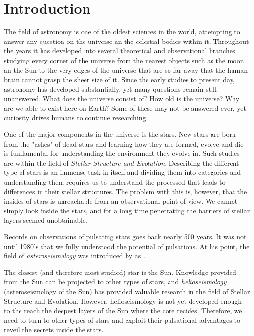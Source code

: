 \chapter{Introduction}

The field of astronomy is one of the oldest sciences in the world, attempting to answer any question on the universe an the celestial bodies within it. Throughout the years it has developed into several theoretical and observational branches studying every corner of the universe from the nearest objects such as the moon an the Sun to the very edges of the universe that are so far away that the human brain cannot grasp the sheer size of it. Since the early studies to present day, astronomy has developed substantially, yet many questions remain still unanswered. What does the universe consist of? How old is the universe? Why are we able to exist here on Earth? Some of these may not be answered ever, yet curiosity drives humans to continue researching. 

One of the major components in the universe is the stars. New stars are born from the "ashes" of dead stars and learning how they are formed, evolve and die is fundamental for understanding the environment they evolve in. Such studies are within the field of \textit{Stellar Structure and Evolution}. Describing the different type of stars is an immense task in itself and dividing them into categories and understanding them requires us to understand the processed that leads to differences in their stellar structures. The problem with this is, however, that the insides of stars is unreachable from an observational point of view. We cannot simply look inside the stars, and for a long time penetrating the barriers of stellar layers seemed unobtainable.

Records on observations of pulsating stars goes back nearly 500 years. It was not until 1980's that we fully understood the potential of pulsations. At his point, the field of \textit{asteroseismology} was introduced by \citet{christensen1984} as    
.

The closest (and therefore most studied) star is the Sun. Knowledge provided from the Sun can be projected to other types of stars, and \textit{helioseismology} (asteroseismology of the Sun) has provided valuable research in the field of Stellar Structure and Evolution. However, helioseismology is not yet developed enough to the reach the deepest layers of the Sun where the core recides. Therefore, we need to turn to other types of stars and exploit their pulsational advantages to reveil the secrets inside the stars. 

